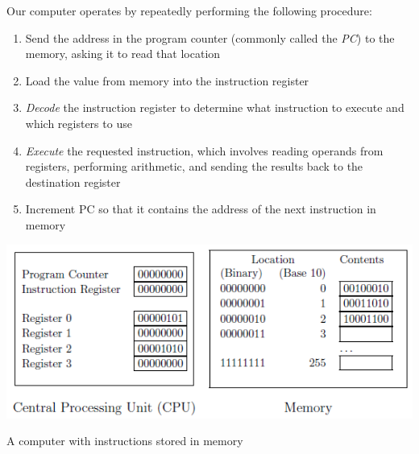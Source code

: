 \documentclass[8pt,a4paper,compress]{beamer}
\begin{document}
\begin{frame}[fragile]
Our computer operates by repeatedly performing the following procedure:
\begin{enumerate}
\item Send the address in the program counter (commonly called the \emph{PC}) to the memory, asking it to read that location

\item Load the value from memory into the instruction register

\item \emph{Decode} the instruction register to determine what instruction to execute and which registers to use

\item \emph{Execute} the requested instruction, which involves reading operands from registers, performing arithmetic, and sending the results back to the destination register

\item Increment PC so that it contains the address of the next instruction in memory
\end{enumerate}
\begin{center}
\includegraphics[scale=0.35]{figures/von_neumann_arch.png}

\smallskip

\tiny A computer with instructions stored in memory
\end{center}

\end{frame}
\end{document}
